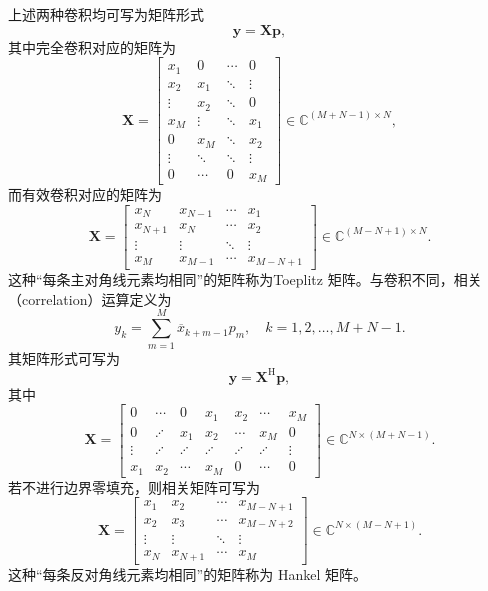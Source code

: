 上述两种卷积均可写为矩阵形式
\begin{equation}
    \bm{y} = \mathbf{X}\bm{p},
\end{equation}
其中完全卷积对应的矩阵为
\[
    \mathbf{X} =
    \begin{bmatrix}
        x_1    & 0      & \cdots & 0      \\
        x_2    & x_1    & \ddots & \vdots \\
        \vdots & x_2    & \ddots & 0      \\
        x_M    & \vdots & \ddots & x_1    \\
        0      & x_M    & \ddots & x_2    \\
        \vdots & \ddots & \ddots & \vdots \\
        0      & \cdots & 0      & x_M
    \end{bmatrix}
    \in \mathbb{C}^{(M+N-1)\times N},
\]
而有效卷积对应的矩阵为
\[
    \mathbf{X} =
    \begin{bmatrix}
        x_N     & x_{N-1} & \cdots & x_1       \\
        x_{N+1} & x_N     & \cdots & x_2       \\
        \vdots  & \vdots  & \ddots & \vdots    \\
        x_{M}   & x_{M-1} & \cdots & x_{M-N+1}
    \end{bmatrix}
    \in \mathbb{C}^{(M-N+1) \times N}.
\]
这种``每条主对角线元素均相同''的矩阵称为Toeplitz 矩阵。与卷积不同，相关（correlation）运算定义为
\begin{equation}
    y_k = \sum_{m=1}^{M} \overline{x}_{k+m-1} p_m,
    \quad k = 1,2,\ldots, M+N-1.
\end{equation}
其矩阵形式可写为
\begin{equation}
    \bm{y} = \mathbf{X}^{\mathrm{H}} \bm{p},
\end{equation}
其中
\[
    \mathbf{X} =
    \begin{bmatrix}
        0      & \cdots  & 0       & x_1     & x_2     & \cdots  & x_M    \\
        0      & \iddots & x_1     & x_2     & \cdots  & x_M     & 0      \\
        \vdots & \iddots & \iddots & \iddots & \iddots & \iddots & \vdots \\
        x_1    & x_2     & \cdots  & x_M     & 0       & \cdots  & 0
    \end{bmatrix}
    \in \mathbb{C}^{N \times (M+N-1)}.
\]
若不进行边界零填充，则相关矩阵可写为
\[
    \mathbf{X} =
    \begin{bmatrix}
        x_1    & x_2     & \cdots & x_{M-N+1} \\
        x_2    & x_3     & \cdots & x_{M-N+2} \\
        \vdots & \vdots  & \ddots & \vdots    \\
        x_N    & x_{N+1} & \cdots & x_M
    \end{bmatrix}
    \in \mathbb{C}^{N \times (M-N+1)}.
\]
这种``每条反对角线元素均相同''的矩阵称为 Hankel 矩阵。

